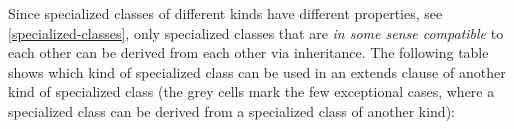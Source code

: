 Since specialized classes of different kinds have different properties,
see \autoref{specialized-classes}, only specialized classes that are \emph{in some sense
compatible} to each other can be derived from each other via
inheritance. The following table shows which kind of specialized class
can be used in an extends clause of another kind of specialized class
(the grey cells mark the few exceptional cases, where a specialized
class can be derived from a specialized class of another kind):


\begin{table}[H]
  \ifpdf{}
\end{table}
